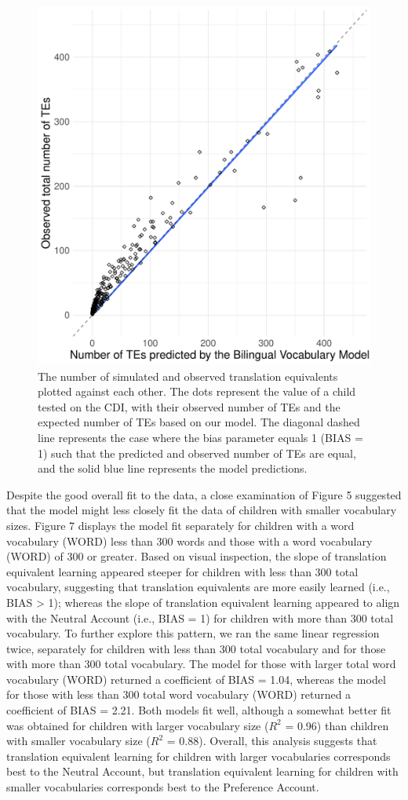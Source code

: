 \documentclass[
  english,
  ,man,floatsintext]{apa6}
\begin{document}
\begin{figure}

{\centering \includegraphics[width=0.6\linewidth,height=0.6\textheight]{paper_TE_bilingual_vocabulary_model_files/figure-latex/fig5-1} 

}

\caption{The number of simulated and observed translation equivalents plotted against each other. The dots represent the value of a child tested on the CDI, with their observed number of TEs and the expected number of TEs based on our model. The diagonal dashed line represents the case where the bias parameter equals 1 (BIAS = 1) such that the predicted and observed number of TEs are equal, and the solid blue line represents the model predictions.}\label{fig:fig5}
\end{figure}

Despite the good overall fit to the data, a close examination of Figure 5 suggested that the model might less closely fit the data of children with smaller vocabulary sizes. Figure 7 displays the model fit separately for children with a word vocabulary (WORD) less than 300 words and those with a word vocabulary (WORD) of 300 or greater. Based on visual inspection, the slope of translation equivalent learning appeared steeper for children with less than 300 total vocabulary, suggesting that translation equivalents are more easily learned (i.e., BIAS \textgreater{} 1); whereas the slope of translation equivalent learning appeared to align with the Neutral Account (i.e., BIAS = 1) for children with more than 300 total vocabulary. To further explore this pattern, we ran the same linear regression twice, separately for children with less than 300 total vocabulary and for those with more than 300 total vocabulary. The model for those with larger total word vocabulary (WORD) returned a coefficient of BIAS = 1.04, whereas the model for those with less than 300 total word vocabulary (WORD) returned a coefficient of BIAS = 2.21. Both models fit well, although a somewhat better fit was obtained for children with larger vocabulary size (\(R^2\) = 0.96) than children with smaller vocabulary size (\(R^2\) = 0.88). Overall, this analysis suggests that translation equivalent learning for children with larger vocabularies corresponds best to the Neutral Account, but translation equivalent learning for children with smaller vocabularies corresponds best to the Preference Account.
\end{document}

